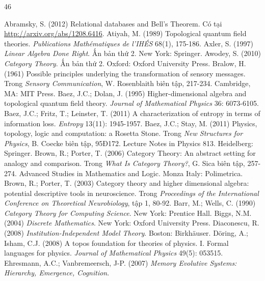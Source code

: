 \renewcommand{\bibname}{Tài liệu tham khảo}
\begin{thebibliography}{46}
\raggedright
{}
 Abramsky, S. (2012) Relational databases and Bell's Theorem.
Có tại \url{http://arxiv.org/abs/1208.6416}.
 Atiyah, M. (1989) Topological quantum field theories.
\emph{Publications Mathématiques de l'IHÉS} 68(1), 175-186.
 Axler, S. (1997) \emph{Linear Algebra Done Right}. Ấn bản thứ 2.
New York: Springer.
 Awodey, S. (2010) \emph{Category Theory}. Ấn bản thứ 2.
Oxford: Oxford University Press.
 Bralow, H. (1961) Possible principles underlying the transformation
of sensory messages. Trong \emph{Sensory Communication}, W. Rosenblaith biên tập,
217-234. Cambridge, MA: MIT Press.
 Baez, J.C.; Dolan, J. (1995) Higher-dimensional algebra and
topological quantum field theory. \emph{Journal of Mathematical Physics} 36:
6073-6105.
 Baez, J.C.; Fritz, T.; Leinster, T. (2011) A characterization
of entropy in terms of information loss. \emph{Entropy} 13(11): 1945-1957.
 Baez, J.C.; Stay, M. (2011) Physics, topology, logic and
computation: a Rosetta Stone. Trong \emph{New Structures for Physics},
B. Coecke biên tập, 95Ð172. Lecture Notes in Physics 813.
Heidelberg: Springer.
 Brown, R.; Porter, T. (2006) Category Theory: An abstract setting
for analogy and comparison. Trong \emph{What Is Category Theory?},
G. Sica biên tập, 257-274. Advanced Studies in Mathematics and Logic.
Monza Italy: Polimetrica.
 Brown, R.; Porter, T. (2003) Category theory and higher
dimensional algebra: potential descriptive tools in neuroscience.
Trong \emph{Proceedings of the International Conference on Theoretical
Neurobiology}, tập 1, 80-92.
 Barr, M.; Wells, C. (1990) \emph{Category Theory for Computing
Science}. New York: Prentice Hall.
 Biggs, N.M. (2004) \emph{Discrete Mathematics}.
New York: Oxford University Press.
 Diaconescu, R. (2008) \emph{Institution-Independent Model Theory}.
Boston: Birkhäuser.
 Döring, A.; Isham, C.J. (2008) A topos foundation for theories
of physics. I. Formal languages for physics. \emph{Journal of Mathematical
Physics} 49(5): 053515.
 Ehresmann, A.C.; Vanbremeersch, J-P. (2007)
\emph{Memory Evolutive Systems: Hierarchy, Emergence, Cognition}.

\end{thebibliography}
